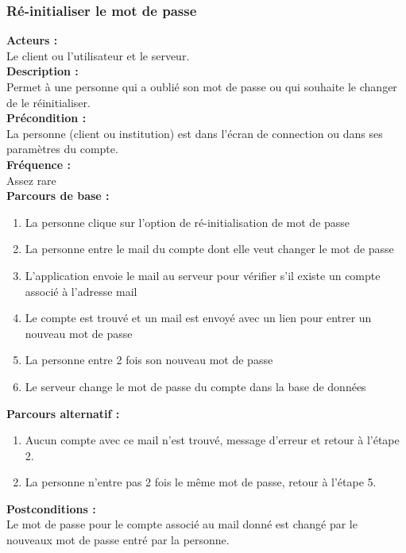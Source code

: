 \documentclass[../rapport.tex]{subfiles}
\begin{document}
\subsubsection{Ré-initialiser le mot de passe}

\textbf{Acteurs :} \\
Le client ou l'utilisateur et le serveur. \\

\textbf{Description :} \\
Permet à une personne qui a oublié son mot de passe ou qui souhaite le changer de le réinitialiser. \\

\textbf{Précondition :} \\
La personne (client ou institution) est dans l’écran de connection ou dans ses paramètres du compte. \\

\textbf{Fréquence :} \\
Assez rare \\

\textbf{Parcours de base :} \\
\begin{enumerate}
    \item La personne clique sur l’option de ré-initialisation de mot de passe
    \item La personne entre le mail du compte dont elle veut changer le mot de passe
    \item L’application envoie le mail au serveur pour vérifier s’il existe un compte associé à l’adresse mail
    \item Le compte est trouvé et un mail est envoyé avec un lien pour entrer un nouveau mot de passe
    \item La personne entre 2 fois son nouveau mot de passe
    \item Le serveur change le mot de passe du compte dans la base de données
\end{enumerate}
\bigskip

\textbf{Parcours alternatif :} \\
\begin{enumerate}
    \item Aucun compte avec ce mail n'est trouvé, message d'erreur et retour à l'étape 2.
    \item La personne n'entre pas 2 fois le même mot de passe, retour à l'étape 5.
\end{enumerate}
\bigskip

\textbf{Postconditions :} \\
Le mot de passe pour le compte associé au mail donné est changé par le nouveaux mot de passe entré par la personne.
\end{document}
